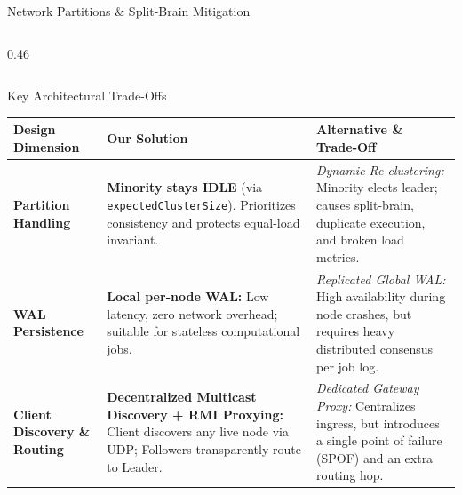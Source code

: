 \documentclass[aspectratio=169, 10pt]{beamer}
\begin{document}
\begin{frame}{Network Partitions \& Split-Brain Mitigation}
\begin{columns}[c]
\begin{column}{0.46\textwidth}
        \end{column}
    \end{columns}
\end{frame}

\begin{frame}{Key Architectural Trade-Offs}
    \begin{table}[h]
        \centering
        \scriptsize
        \begin{tabular}{p{2.6cm} p{5.3cm} p{5.5cm}}
            \toprule
            \textbf{Design Dimension} & \textbf{Our Solution} & \textbf{Alternative \& Trade-Off} \\
            \midrule
            \textbf{Partition Handling} & 
            \textbf{Minority stays IDLE} (via \texttt{expectedClusterSize}). Prioritizes consistency and protects equal-load invariant. & 
            \textit{Dynamic Re-clustering:} Minority elects leader; causes split-brain, duplicate execution, and broken load metrics. \\
            \addlinespace
            \textbf{WAL Persistence} & 
            \textbf{Local per-node WAL:} Low latency, zero network overhead; suitable for stateless computational jobs. & 
            \textit{Replicated Global WAL:} High availability during node crashes, but requires heavy distributed consensus per job log. \\
            \addlinespace
            \textbf{Client Discovery \& Routing} & 
            \textbf{Decentralized Multicast Discovery + RMI Proxying:} Client discovers any live node via UDP; Followers transparently route to Leader. & 
            \textit{Dedicated Gateway Proxy:} Centralizes ingress, but introduces a single point of failure (SPOF) and an extra routing hop. \\
            \bottomrule
        \end{tabular}
    \end{table}
\end{frame}
 
\end{document}
